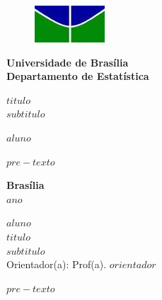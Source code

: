 \documentclass[12pt, a4paper, twoside]{article}
\numberwithin{equation}{subsection} %
\newcommand{\titulo}{$titulo$ \\ $subtitulo$}
\newcommand{\autor}{$aluno$}
\newcommand{\orientador}{ Prof(a). $orientador$ }
\newcommand{\coorientador}{ Prof(a). $coorientador$ }
\begin{document}
\begin{titlepage}
\begin{center}
\begin{figure}[h!]
	\centering
		\includegraphics[scale = 0.8]{unb.png}
	\label{fig:unb}
\end{figure}
{\bf Universidade de Brasília \\
\bf Departamento de Estatística}
\vspace{5cm}

\setcounter{page}{0}
\null
\textbf{\titulo}
\vspace{2.5cm}


\vspace{0.2cm}
\textbf{\autor}
\end{center}
\vspace{1.5cm}

\begin{flushright}
\begin{minipage}{7.5cm}
\parbox[t]{7.5cm}{$pre-texto$}
\end{minipage}
\end{flushright}

\vspace{5cm}

\begin{center}
{\bf{Brasília} \\ }
\bf{$ano$}
\end{center}
\end{titlepage}



\thispagestyle{empty}

\begin{center}
\textbf{\autor} \\
\vspace{5cm}
\textbf{\titulo} \\
\vspace{3cm}
\small
Orientador(a): \orientador \\
\end{center}


\vspace*{3cm}

\begin{flushright}
\begin{minipage}{7.5cm}
 \parbox[t]{7.5cm}{$pre-texto$}
\end{minipage}
\end{flushright}
\end{document}
